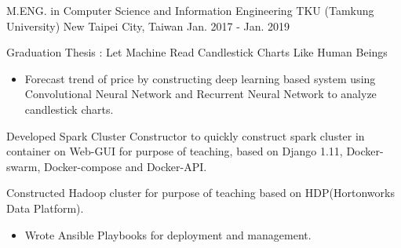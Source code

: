 

\begin{cventries}

    \cventry
        {M.ENG. in Computer Science and Information Engineering}
        {TKU (Tamkung University)}
        {New Taipei City, Taiwan}
        {Jan. 2017 - Jan. 2019}
        {
            \begin{cvitems}
                \item 
                    {
                        Graduation Thesis : Let Machine Read Candlestick Charts Like Human Beings
                        \begin{itemize}
                            \item Forecast trend of price by constructing deep learning based system using Convolutional Neural Network and Recurrent Neural Network to analyze candlestick charts.
                        \end{itemize}
                    }
                \item
                    {
                        Developed Spark Cluster Constructor to quickly construct spark cluster in container on Web-GUI for purpose of teaching, based on Django 1.11, Docker-swarm, Docker-compose and Docker-API.
                    }
                \item
                    {
                        Constructed Hadoop cluster for purpose of teaching based on HDP(Hortonworks Data Platform).
                        \begin{itemize}
                            \item Wrote Ansible Playbooks for deployment and management.
                        \end{itemize}
                    }
            \end{cvitems}
        }


\end{cventries}
